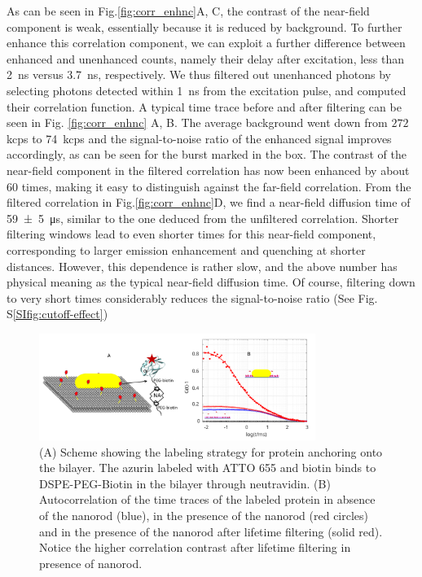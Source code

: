 As can be seen in Fig.\ref{fig:corr_enhnc}A, C, the contrast of the near-field component is weak, essentially because it is reduced by background.
To further enhance this correlation component, we can exploit a further difference between enhanced and unenhanced counts, namely their delay after excitation, less than \SI{2}{\ns} 
versus \SI{3.7}{\ns}, respectively.
We thus filtered out unenhanced photons by selecting photons detected within \SI{1}{\ns} from the excitation pulse, and computed their correlation function.
A typical time trace before and after filtering can be seen in Fig. \ref{fig:corr_enhnc} A, B.
The average background went down from $272~$kcps to \SI{74}{kcps}  and the signal-to-noise ratio of the enhanced signal improves accordingly, as can be seen for the burst marked in the box. 
The contrast of the near-field component in the filtered correlation has now been enhanced by about 60 times, making it easy to distinguish against the far-field correlation.
From the filtered correlation in Fig.\ref{fig:corr_enhnc}D, we find a near-field diffusion time of \SI[separate-uncertainty = true]{59(5)}{\us}, similar to the one deduced from the unfiltered correlation.
Shorter filtering windows lead to even shorter times for this near-field component, corresponding to larger emission enhancement and quenching at shorter distances.
However, this dependence is rather slow, and the above number has physical meaning as the typical near-field diffusion time.
Of course, filtering down to very short times considerably reduces the signal-to-noise ratio (See Fig. S\ref{SIfig:cutoff-effect})

\begin{figure}[ht]
	\centering
	\includegraphics[width=0.8\textwidth]{Zn_azurin_efcs}
	\caption{(A) Scheme showing the labeling strategy for protein anchoring onto the bilayer.
	The azurin labeled with ATTO 655 and biotin binds to DSPE-PEG-Biotin in the bilayer through neutravidin.
	(B) Autocorrelation of the time traces of the labeled protein in absence of the nanorod (blue), in the presence of the nanorod (red circles) 
	and in the presence of the nanorod after lifetime filtering (solid red).
	Notice the higher correlation contrast after lifetime filtering in presence of nanorod.}
	\label{fig:Zn_azurin_efcs}
\end{figure}

